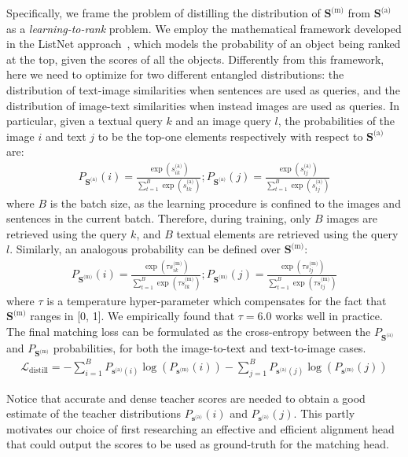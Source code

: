 \documentclass[sigconf]{acmart}
\begin{document}
Specifically, we frame the problem of distilling the distribution of $\boldsymbol{S}^\text{(m)}$ from $\boldsymbol{S}^\text{(a)}$ as a \textit{learning-to-rank} problem.
We employ the mathematical framework developed in the ListNet approach~\citep{cao2007learning}, which models the probability of an object being ranked at the top, given the scores of all the objects. Differently from this framework, here we need to optimize for two different entangled distributions: the distribution of text-image similarities when sentences are used as queries, and the distribution of image-text similarities when instead images are used as queries.
In particular, given a textual query $k$ and an image query $l$, the probabilities of the image $i$ and text $j$ to be the top-one elements respectively with respect to $\boldsymbol{S}^\text{(a)}$ are:
\begin{align}
P_{\boldsymbol{S}^\text{(a)}}(i) = \frac{\exp(s_{ik}^\text{(a)})}{\sum_{t=1}^{B} \exp(s_{tk}^\text{(a)})};  P_{\boldsymbol{S}^\text{(a)}}(j) = \frac{\exp(s_{lj}^\text{(a)})}{\sum_{t=1}^{B} \exp(s_{tj}^\text{(a)})}
\end{align}
where $B$ is the batch size, as the learning procedure is confined to the images and sentences in the current batch. Therefore, during training, only $B$ images are retrieved using the query $k$, and $B$ textual elements are retrieved using the query $l$.
Similarly, an analogous probability can be defined over $\boldsymbol{S}^\text{(m)}$:
\begin{align}
P_{\boldsymbol{S}^\text{(m)}}(i) = \frac{\exp(\tau s_{ik}^\text{(m)})}{\sum_{t=1}^{B} \exp(\tau s_{tk}^\text{(m)})};  P_{\boldsymbol{S}^\text{(m)}}(j) = \frac{\exp(\tau s_{lj}^\text{(m)})}{\sum_{t=1}^{B} \exp(\tau s_{tj}^\text{(m)})}
\end{align}
where $\tau$ is a temperature hyper-parameter which compensates for the fact that $\boldsymbol{S}^\text{(m)}$ ranges in [0, 1]. We empirically found that $\tau=6.0$ works well in practice.
The final matching loss can be formulated as the cross-entropy between the $P_{\boldsymbol{S}^\text{(a)}}$ and $P_{\boldsymbol{S}^\text{(m)}}$ probabilities, for both the image-to-text and text-to-image cases.
\begin{align}
    \mathcal{L}_{\text{distill}} = - \sum_{i=1}^B P_{\boldsymbol{s}^\text{(a)}(i)} \log(P_{\boldsymbol{s}^\text{(m)}}(i)) - \sum_{j=1}^B P_{\boldsymbol{s}^\text{(a)}(j)} \log(P_{\boldsymbol{s}^\text{(m)}}(j))
\end{align}

Notice that accurate and dense teacher scores are needed to obtain a good estimate of the teacher distributions $P_{\boldsymbol{s}^\text{(a)}}(i)$ and $P_{\boldsymbol{s}^\text{(a)}}(j)$. This partly motivates our choice of first researching an effective and efficient alignment head that could output the scores to be used as ground-truth for the matching head.
\end{document}
